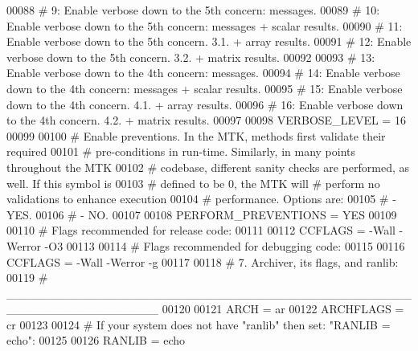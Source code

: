 \begin{DoxyCode}
00088 \textcolor{stringliteral}{# 9: Enable verbose down to the 5th concern: messages.}
00089 \textcolor{stringliteral}{# 10: Enable verbose down to the 5th concern: messages + scalar results.}
00090 \textcolor{stringliteral}{# 11: Enable verbose down to the 5th concern. 3.1. + array results.}
00091 \textcolor{stringliteral}{# 12: Enable verbose down to the 5th concern. 3.2. + matrix results.}
00092 \textcolor{stringliteral}{}
00093 \textcolor{stringliteral}{# 13: Enable verbose down to the 4th concern: messages.}
00094 \textcolor{stringliteral}{# 14: Enable verbose down to the 4th concern: messages + scalar results.}
00095 \textcolor{stringliteral}{# 15: Enable verbose down to the 4th concern. 4.1. + array results.}
00096 \textcolor{stringliteral}{# 16: Enable verbose down to the 4th concern. 4.2. + matrix results.}
00097 \textcolor{stringliteral}{}
00098 \textcolor{stringliteral}{VERBOSE\_LEVEL = 16}
00099 \textcolor{stringliteral}{}
00100 \textcolor{stringliteral}{# Enable preventions. In the MTK, methods first validate their required}
00101 \textcolor{stringliteral}{# pre-conditions in run-time. Similarly, in many points throughout the MTK}
00102 \textcolor{stringliteral}{# codebase, different sanity checks are performed, as well. If this symbol is}
00103 \textcolor{stringliteral}{# defined to be 0, the MTK will # perform no validations to enhance execution}
00104 \textcolor{stringliteral}{# performance. Options are:}
00105 \textcolor{stringliteral}{# - YES.}
00106 \textcolor{stringliteral}{# - NO.}
00107 \textcolor{stringliteral}{}
00108 \textcolor{stringliteral}{PERFORM\_PREVENTIONS = YES}
00109 \textcolor{stringliteral}{}
00110 \textcolor{stringliteral}{# Flags recommended for release code:}
00111 \textcolor{stringliteral}{}
00112 \textcolor{stringliteral}{CCFLAGS = -Wall -Werror -O3}
00113 \textcolor{stringliteral}{}
00114 \textcolor{stringliteral}{# Flags recommended for debugging code:}
00115 \textcolor{stringliteral}{}
00116 \textcolor{stringliteral}{CCFLAGS = -Wall -Werror -g}
00117 \textcolor{stringliteral}{}
00118 \textcolor{stringliteral}{#   7. Archiver, its flags, and ranlib:}
00119 \textcolor{stringliteral}{#   \_\_\_\_\_\_\_\_\_\_\_\_\_\_\_\_\_\_\_\_\_\_\_\_\_\_\_\_\_\_\_\_\_\_\_\_\_\_\_\_\_\_\_\_\_\_\_\_\_\_\_\_\_\_\_\_\_\_\_\_\_\_\_\_\_\_}
00120 \textcolor{stringliteral}{}
00121 \textcolor{stringliteral}{ARCH      = ar}
00122 \textcolor{stringliteral}{ARCHFLAGS = cr}
00123 \textcolor{stringliteral}{}
00124 \textcolor{stringliteral}{# If your system does not have "ranlib" then set: "RANLIB = echo":}
00125 \textcolor{stringliteral}{}
00126 \textcolor{stringliteral}{RANLIB = echo}

\end{DoxyCode}
